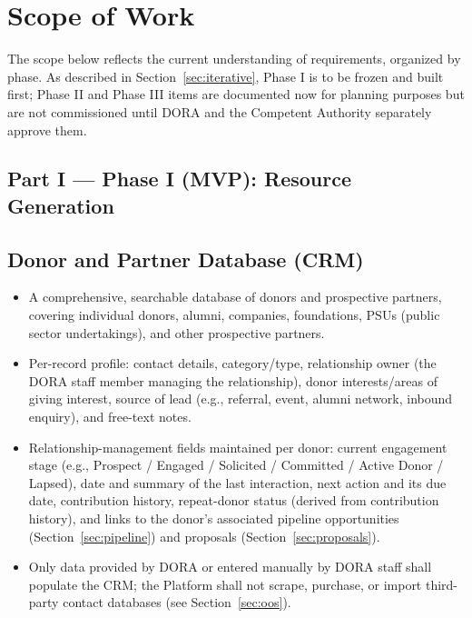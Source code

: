 \documentclass[11pt]{article}
\begin{document}
\section{Scope of Work}
\label{sec:scope}
The scope below reflects the current understanding of requirements, organized by phase. As described in Section~\ref{sec:iterative}, Phase I is to be frozen and built first; Phase II and Phase III items are documented now for planning purposes but are not commissioned until DORA and the Competent Authority separately approve them.

\subsection*{Part I --- Phase I (MVP): Resource Generation}

\subsection{Donor and Partner Database (CRM)}
\label{sec:crm}
\begin{itemize}[leftmargin=1.4em, itemsep=3pt]
\item A comprehensive, searchable database of donors and prospective partners, covering individual donors, alumni, companies, foundations, PSUs (public sector undertakings), and other prospective partners.
\item Per-record profile: contact details, category/type, relationship owner (the DORA staff member managing the relationship), donor interests/areas of giving interest, source of lead (e.g., referral, event, alumni network, inbound enquiry), and free-text notes.
\item Relationship-management fields maintained per donor: current engagement stage (e.g., Prospect / Engaged / Solicited / Committed / Active Donor / Lapsed), date and summary of the last interaction, next action and its due date, contribution history, repeat-donor status (derived from contribution history), and links to the donor's associated pipeline opportunities (Section~\ref{sec:pipeline}) and proposals (Section~\ref{sec:proposals}).
\item Only data provided by DORA or entered manually by DORA staff shall populate the CRM; the Platform shall not scrape, purchase, or import third-party contact databases (see Section~\ref{sec:oos}).
\end{itemize}
\end{document}
